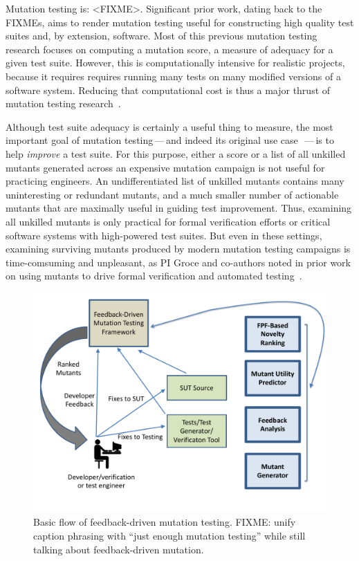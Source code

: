 Mutation testing is: <FIXME>.  Significant prior work, dating back to the
FIXMEs, aims to render mutation testing useful for constructing high quality
test suites and, by extension, software. 
Most of this previous mutation testing
research focuses on computing a mutation score, a measure of adequacy for a
given test suite.  However, this is computationally intensive for realistic
projects, because it requires requires running many tests on many modified
versions of a software system.  Reducing that computational cost is thus a major
thrust of mutation testing research~\cite{jia2011analysis}.   

Although test suite adequacy is certainly a useful thing to measure, the most
important goal of mutation testing\,---\,and indeed its original use
case~\cite{something}\,---\,is to help \emph{improve} a test suite.  For this
purpose, either a score or a list of all unkilled mutants generated across an
expensive mutation campaign is not useful for practicing engineers.  An
undifferentiated list of unkilled mutants contains many uninteresting or
redundant mutants, and a much smaller number of actionable mutants that are
maximally useful in guiding test improvement.  Thus, examining all unkilled
mutants is only practical for formal verification efforts or critical software
systems with high-powered test suites.  But even in these settings, examining
surviving mutants produced by modern mutation testing campaigns is
time-comsuming and unpleasant, as PI Groce and co-authors noted in prior work on
using mutants to drive formal verification and automated
testing~\cite{groce2015verified,groce2018verified,mutKernel}.


\begin{figure}
\centering
\includegraphics[width=0.8\columnwidth]{TestFlow}

\caption{Basic flow of feedback-driven mutation testing. FIXME: unify caption
  phrasing with ``just enough mutation testing'' while still talking about
  feedback-driven mutation.}
\label{fig:flow}
\end{figure}

